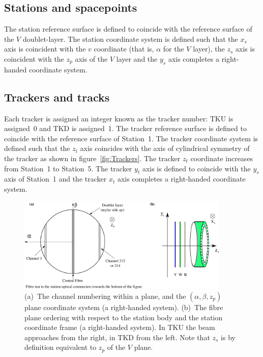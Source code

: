   \subsection{Stations and spacepoints}
  The station reference surface is defined to coincide with the reference surface of the $V$ doublet-layer. The station coordinate system is defined such that the $x_s$ axis is coincident with the $v$ coordinate (that is, $\alpha$ for the $V$ layer), the $z_s$ axis is coincident with the $z_p$ axis of the $V$ layer and the $y_s$ axis completes a right-handed coordinate system.

  \subsection{Trackers and tracks}
  Each tracker is assigned an integer known as the tracker number: TKU is assigned~0 and TKD is assigned~1. The tracker reference surface is defined to coincide with the reference surface of Station~1. The tracker coordinate system is defined such that the $z_t$ axis coincides with the axis of cylindrical symmetry of the tracker as shown in figure~\ref{fig:Trackers}. The tracker $z_t$ coordinate increases from Station~1 to Station~5. The tracker $y_t$ axis is defined to coincide with the $y_s$ axis of Station~1 and the tracker $x_t$ axis completes a right-handed coordinate system. 
  
  \begin{figure}[htb]
    \begin{center}
      \includegraphics[width=0.9\textwidth]{02-CoordinateSystems/PlaneCoordinatesAndNumbering.pdf}
      \caption{\label{fig:DoubletLayerOrder} (a)~The channel numbering within a plane, and the $(\alpha, \beta, z_p)$ plane coordinate system (a right-handed system).  (b)~The fibre plane ordering with respect to the station body and the station coordinate frame (a right-handed system).  In TKU the beam approaches from the right, in TKD from the left. Note that $z_s$ is by definition equivalent to $z_p$ of the $V$ plane.}
    \end{center}
  \end{figure}

